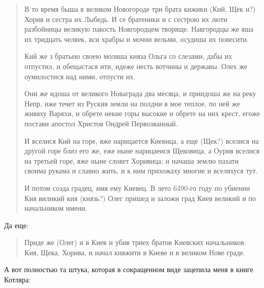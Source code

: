 \begin{quotation}
В то время быша в великом Новогороде три брата кижики (Кий, Щек и?) Хорив и сестра их Лыбедь. И се братеники и с сестрою их люти разбойницы великую пакость Новгородцем творяще. Навгородцы же яша их тридцать челвек, вси храбры и мочни вельми, осудиша их повесити. 

Кий же з братьею своею моляша княза Ольга со слезами, дабы их отпустил, и обещастася ити, идеже несть вотчины и державы. Олех же оумилостися над ними, отпусти их. 

Они же идоша от великого Новаграда два месяца, и приидоша же на реку Непр, иже течет из Руския земли на полдни в мое теплое, по ней же живяху Варяхи, и обрете некие горы высокие и обрете на них крест, егоже постави апостол Христов Ондрей Первозванный. 

И вселися Кий на горе, яже нарицается Киевица, а еще (Щек?) вселися на другой горе близ его же, еже ныне нарицаеися Щековица, а Оурив вселися на третьей горе, яже ныне словет Хоривица; и начаша землю пахати своима рукама и славно жить, и к ним прихожаху многие и вселяхуся тут. 

И потом созда градец, имя ему Киевец. В лето 6490-го году по убиении Кия виликий кия (князь?) Олег пришед и заложи град Киев великий и по начальником имени.
\end{quotation}

Да еще:

\begin{quotation}
Приде же (Олег) и в Киев и убив триех братов Киевских начальников: Кия, Щека, Хорива, и начал княжити в Киеве и в великом Нове граде.
\end{quotation}

А вот полностью та штука, которая в сокращенном виде зацепила меня в книге Котляра:

